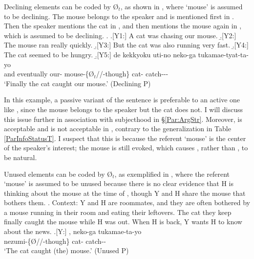 
Declining elements can be coded by {\O$_{t}$},
as shown in \Next,
where `mouse' is assumed to be declining.
The mouse belongs to the speaker and is mentioned first in \Next[-Y2].
Then the speaker mentions the cat in \Next[-Y3-4],
and then mentions the mouse again in \Next[-Y5], which is assumed to be declining.
%
\ex.
 \a.[Y1:] A cat was chasing our mouse.
 \b.[Y2:] The mouse ran really quickly.
 \b.[Y3:] But the cat was also running very fast.
 \b.[Y4:] The cat seemed to be hungry.
 \b.[Y5:] de kekkyoku uti-no  neko-ga tukamae-tyat-ta-yo \\
   and eventually our- {mouse-\{{\O$_{t}$}//-though\}} cat- catch--- \\
   `Finally the cat caught our mouse.' \hfill{(Declining  P)}

In this example,
a passive variant of the sentence is preferable to an active one like \Last[-Y5], since the mouse belongs to the speaker but the cat does not.
I will discuss this issue further in association with subjecthood in \S \ref{Par:ArgStr}.
Moreover,
 is acceptable and  is not acceptable in \Last[-Y5],
contrary to the generalization in Table \ref{ParInfoStatusT}.
I suspect that this is because the referent `mouse' is the center of the speaker's interest;
the mouse is still evoked,
which causes , rather than , to be natural.

Unused elements can be coded by {\O$_{t}$},
as exemplified in \Next,
where the referent `mouse' is assumed to be unused
because there is no clear evidence that H is thinking about the mouse at the time of ,
though Y and H share the mouse that bothers them.
%
\ex. \label{UnusedMouse}Context: Y and H are roommates, and they are often bothered by a mouse running in their room
		and eating their leftovers.
		The cat they keep finally caught the mouse while H was out.
		When H is back, Y wants H to know about the news.
	\ag.[Y:] , neko-ga tukamae-ta-yo \\
		nezumi-\{{\O}//-though\} cat- catch-- \\
		`The cat caught (the) mouse.' \hfill{(Unused  P)}


